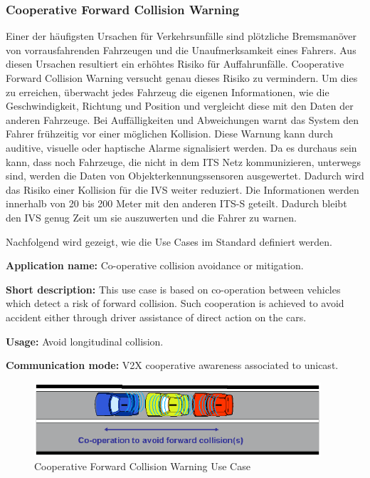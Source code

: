 \subsubsection{Cooperative Forward Collision Warning}
Einer der häufigsten Ursachen für Verkehrsunfälle sind plötzliche Bremsmanöver von vorrausfahrenden Fahrzeugen und die Unaufmerksamkeit eines Fahrers. Aus diesen Ursachen resultiert ein erhöhtes Risiko für Auffahrunfälle. Cooperative Forward Collision Warning versucht genau dieses Risiko zu vermindern. Um dies zu erreichen, überwacht jedes Fahrzeug die eigenen Informationen, wie die Geschwindigkeit, Richtung und Position und vergleicht diese mit den Daten der anderen Fahrzeuge. Bei Auffälligkeiten und Abweichungen warnt das System den Fahrer frühzeitig vor einer möglichen Kollision. Diese Warnung kann durch auditive, visuelle oder haptische Alarme signalisiert werden. Da es durchaus sein kann, dass noch Fahrzeuge, die nicht in dem \ac{ITS} Netz kommunizieren, unterwegs sind, werden die Daten von Objekterkennungssensoren ausgewertet. Dadurch wird das Risiko einer Kollision für die \ac{IVS} weiter reduziert. Die Informationen werden innerhalb von 20 bis 200 Meter mit den anderen \ac{ITS-S} geteilt. Dadurch bleibt den \ac{IVS} genug Zeit um sie auszuwerten und die Fahrer zu warnen.


Nachfolgend wird gezeigt, wie die Use Cases im Standard definiert werden.


\textbf{Application name:} Co-operative collision avoidance or mitigation.

\textbf{Short description:} This use case is based on co-operation between vehicles which detect a risk of forward collision.
Such co\-operation is achieved to avoid accident either through driver assistance of direct action on the cars.

\textbf{Usage:} Avoid longitudinal collision.

\textbf{Communication mode:} V2X co\-operative awareness associated to unicast.

\begin{figure}[htbp]
\includegraphics[width=0.95\textwidth]{content/images/06_use_cases/colissionwarning.png}
\caption{Cooperative Forward Collision Warning Use Case \cite{etsi102638}}
\label{fig:cfcw}
\end{figure}

